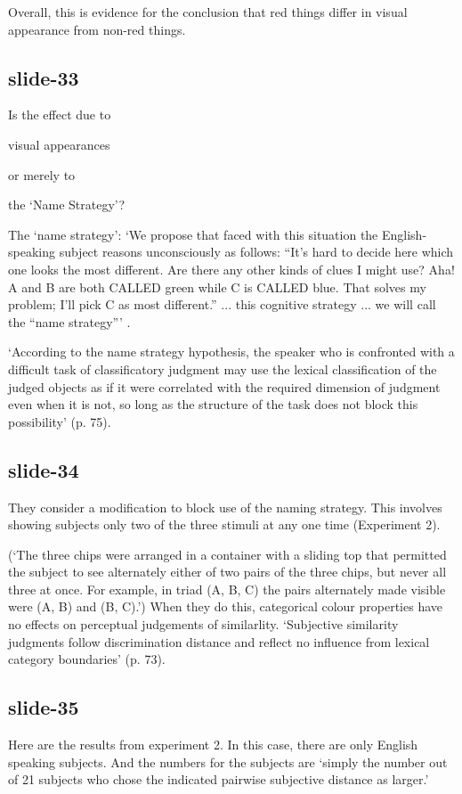 \documentclass[12pt,\papersize]{extarticle}
\begin{document}
Overall, this is evidence for the conclusion that
red things differ in visual appearance from non-red things.

\subsection{slide-33}
Is the effect due to

visual appearances

or merely to

the ‘Name Strategy’?


The ‘name strategy’: ‘We propose that faced with this situation the
English-speaking subject reasons
unconsciously as follows: “It's hard to decide here which one looks the most
different. Are there any other kinds of clues I might use? Aha! A and B are
both CALLED green while C is CALLED blue. That solves my problem; I'll pick C
as most different.” ... this cognitive strategy ... we will call the
“name strategy”’ \citep[p.~72]{kay_what_1984}.

‘According to the name strategy hypothesis, the speaker who is
confronted with a difficult task of classificatory judgment may use the lexical
classification of the judged objects as if it were correlated with the required
dimension of judgment even when it is not, so long as the structure of the task
does not block this possibility’ (p. 75).

\subsection{slide-34}
They consider a modification to block
use of the naming strategy.
This involves showing subjects only two of the three
stimuli at any one time (Experiment 2).

(‘The three chips were arranged in a
container with a sliding top that permitted the subject to see alternately
either of two pairs of the three chips, but never all three at once. For
example, in triad (A, B, C) the pairs alternately made visible were (A, B) and
(B, C).’) When they do this, categorical colour properties have no effects on
perceptual judgements of similarlity. ‘Subjective similarity judgments follow
discrimination distance and reflect no influence from lexical category
boundaries’ (p. 73).

\subsection{slide-35}
Here are the results from experiment 2.
In this case, there are only English speaking subjects.
And the numbers for the subjects are
‘simply the number out of 21 subjects who chose the indicated pairwise subjective distance as larger.’
\end{document}
